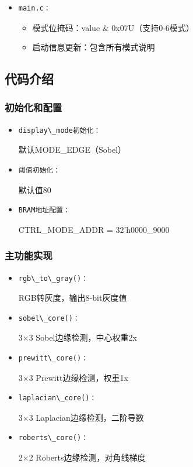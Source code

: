 \begin{itemize}
    \item \begin{verbatim}main.c：\end{verbatim}
    \begin{itemize}
        \item 模式位掩码：value \& 0x07U（支持0-6模式）
        \item 启动信息更新：包含所有模式说明
    \end{itemize}
\end{itemize}

\subsection{代码介绍}

\subsubsection{初始化和配置}

\begin{itemize}
    \item \begin{verbatim}display\_mode初始化：\end{verbatim}默认MODE\_EDGE（Sobel）
    \item \begin{verbatim}阈值初始化：\end{verbatim}默认值80
    \item \begin{verbatim}BRAM地址配置：\end{verbatim}CTRL\_MODE\_ADDR = 32'h0000\_9000
\end{itemize}

\subsubsection{主功能实现}

\begin{itemize}
    \item \begin{verbatim}rgb\_to\_gray()：\end{verbatim}RGB转灰度，输出8-bit灰度值
    \item \begin{verbatim}sobel\_core()：\end{verbatim}3×3 Sobel边缘检测，中心权重2x
    \item \begin{verbatim}prewitt\_core()：\end{verbatim}3×3 Prewitt边缘检测，权重1x
    \item \begin{verbatim}laplacian\_core()：\end{verbatim}3×3 Laplacian边缘检测，二阶导数
    \item \begin{verbatim}roberts\_core()：\end{verbatim}2×2 Roberts边缘检测，对角线梯度
\end{itemize}

